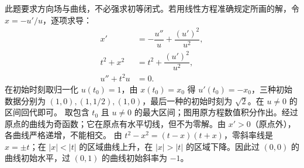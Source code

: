 此题要求方向场与曲线，不必强求初等闭式。若用线性方程准确规定所画的解，令 $x=-u'/u$，逐项求导：
\[
\begin{aligned}
x'&=-\dfrac{u''}{u}+\dfrac{(u')^2}{u^2},\\
t^2+x^2&=t^2+\dfrac{(u')^2}{u^2},\\
u''+t^2u&=0.
\end{aligned}
\]
在初始时刻取归一化 $u(t_0)=1$，由 $x(t_0)=x_0$ 得 $u'(t_0)=-x_0$，三种初始数据分别为 $(1,0),(1,1/2),(1,0)$，最后一种的初始时刻为 $\sqrt2$。在 $u\ne0$ 的区间回代即可。
取包含 $t_0$ 且 $u\ne0$ 的最大区间；图用原方程数值积分作出。经过原点的曲线为奇函数；它在原点有水平切线，但不为零解。由 $x'>0$（原点外），各曲线严格递增，不能相交。
由 $t^2-x^2=(t-x)(t+x)$，零斜率线是 $x=\pm t$；在 $|x|<|t|$ 的区域曲线上升，在 $|x|>|t|$ 的区域下降。因此过 $(0,0)$ 的曲线初始水平，过 $(0,1)$ 的曲线初始斜率为 $-1$。


